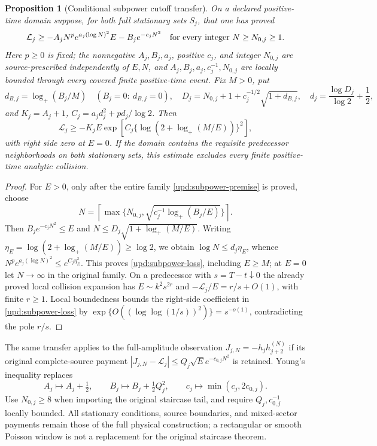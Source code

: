 \documentclass[11pt]{article}
\numberwithin{equation}{section}
\newtheorem{proposition}[theorem]{Proposition}
\theoremstyle{definition}
\theoremstyle{remark}
\newcommand{\Lag}{\mathcal L}
\begin{document}
\begin{proposition}[Conditional subpower cutoff transfer]
\label{upd:subpower-transfer}
On a declared positive-time domain suppose, for both full stationary
sets $S_j$, that one has proved
\begin{equation}
 \Lag_j\ge-A_jN^p e^{a_j(\log N)^2}E-B_je^{-c_jN^2}
 \quad\hbox{for every integer }N\ge N_{0,j}\ge1.
 \label{upd:subpower-premise}
\end{equation}
Here $p\ge0$ is fixed; the nonnegative $A_j,B_j,a_j$, positive $c_j$,
and integer $N_{0,j}$ are source-prescribed independently of $E,N$,
and $A_j,B_j,a_j,c_j^{-1},N_{0,j}$ are locally bounded through every
covered finite positive-time event. Fix $M>0$, put
\[
 d_{B,j}=\log_+(B_j/M)\quad(B_j=0:\ d_{B,j}=0),\quad
 D_j=N_{0,j}+1+c_j^{-1/2}\sqrt{1+d_{B,j}},\quad
 d_j=\frac{\log D_j}{\log2}+\frac12,
\]
and $K_j=A_j+1$, $C_j=a_jd_j^2+pd_j/\log2$. Then
\begin{equation}
 \Lag_j\ge-K_jE\exp\left[
 C_j\{\log(2+\log_+(M/E))\}^2\right],
 \label{upd:subpower-loss}
\end{equation}
with right side zero at $E=0$.  If the domain contains the requisite
predecessor neighborhoods on both stationary sets, this estimate
excludes every finite positive-time analytic collision.
\end{proposition}
\begin{proof}
For $E>0$, only after the entire family
\eqref{upd:subpower-premise} is proved, choose
\[
 N=\left\lceil\max\{N_{0,j},
                 \sqrt{c_j^{-1}\log_+(B_j/E)}\}\right\rceil.
\]
Then $B_je^{-c_jN^2}\le E$ and
$N\le D_j\sqrt{1+\log_+(M/E)}$.
Writing $\eta_E=\log(2+\log_+(M/E))\ge\log2$, we obtain
$\log N\le d_j\eta_E$, whence
$N^p e^{a_j(\log N)^2}\le e^{C_j\eta_E^2}$.
This proves \eqref{upd:subpower-loss}, including $E\ge M$; at
$E=0$ let $N\to\infty$ in the original family.
On a predecessor with $s=T-t\downarrow0$ the already proved local
collision expansion has $E\sim k^2s^{2r}$ and
$-\Lag_j/E=r/s+O(1)$, with finite $r\ge1$.
Local boundedness bounds the right-side coefficient in
\eqref{upd:subpower-loss} by
$\exp\{O((\log\log(1/s))^2)\}=s^{-o(1)}$,
contradicting the pole $r/s$.
\end{proof}

The same transfer applies to the full-amplitude observation
$J_{j,N}=-h_jh_{j+2}^{(N)}$ if its original complete-source payment
$|J_{j,N}-\Lag_j|\le Q_j\sqrt E e^{-c_{0,j}N^2}$ is retained.
Young's inequality replaces
\[
 A_j\mapsto A_j+\tfrac12,\qquad
 B_j\mapsto B_j+\tfrac12Q_j^2,\qquad
 c_j\mapsto\min(c_j,2c_{0,j}).
\]
Use $N_{0,j}\ge8$ when importing the original staircase tail, and
require $Q_j,c_{0,j}^{-1}$ locally bounded. All stationary conditions,
source boundaries, and mixed-sector payments remain those of the full
physical construction; a rectangular or smooth Poisson window is not
a replacement for the original staircase theorem.
\end{document}
